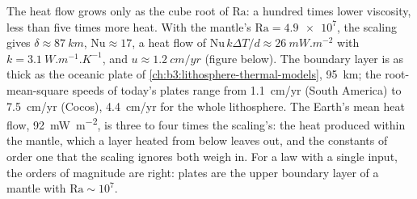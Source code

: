 The heat flow grows only as the cube root of $\mathrm{Ra}$: a hundred times
lower viscosity, less than five times more heat. With the mantle's
$\mathrm{Ra} = \num{4.9e7}$, the scaling gives $\delta \approx \qty{87}{km}$,
$\mathrm{Nu} \approx 17$, a heat flow of $\mathrm{Nu}\,k\Delta T/d \approx
\qty{26}{mW.m^{-2}}$ with $k = \qty{3.1}{W.m^{-1}.K^{-1}}$, and $u \approx
\qty{1.2}{cm/yr}$ (figure below). The boundary layer is as thick as the
oceanic plate of \cref{ch:b3:lithosphere-thermal-models}, \qty{95}{km}; the
root-mean-square speeds of today's plates range from \qty{1.1}{cm/yr} (South
America) to \qty{7.5}{cm/yr} (Cocos), \qty{4.4}{cm/yr} for the whole
lithosphere. The Earth's mean heat flow, \qty{92}{mW.m^{-2}}, is three to four
times the scaling's: the heat produced within the mantle, which a layer
heated from below leaves out, and the constants of order one that the scaling
ignores both weigh in. For a law with a single input, the orders of magnitude
are right: plates are the upper boundary layer of a mantle with $\mathrm{Ra}
\sim 10^7$.

